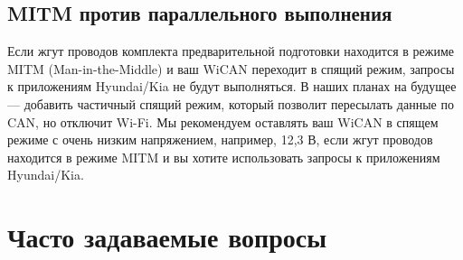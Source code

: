 \documentclass[superscriptaddress,onecolumn,floatfix]{revtex4-2}
\begin{document}
\subsection{MITM против параллельного выполнения}
Если жгут проводов комплекта предварительной подготовки находится в режиме MITM (Man-in-the-Middle) и ваш WiCAN переходит в спящий режим, запросы к приложениям Hyundai/Kia не будут выполняться. В наших планах на будущее — добавить частичный спящий режим, который позволит пересылать данные по CAN, но отключит Wi-Fi. Мы рекомендуем оставлять ваш WiCAN в спящем режиме с очень низким напряжением, например, 12,3 В, если жгут проводов находится в режиме MITM и вы хотите использовать запросы к приложениям Hyundai/Kia. 

\section{Часто задаваемые вопросы}
\end{document}

